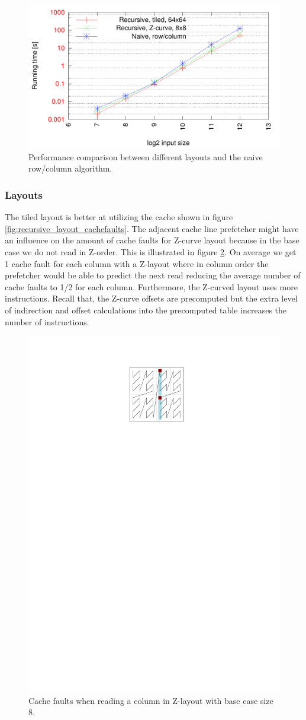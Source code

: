 \begin{figure}[h!]
  \centering
  \includegraphics[width=\textwidth]{"../project2/gnuplots/recursive_performance"}
  \caption{Performance comparison between different layouts and the naive row/column algorithm.}
  \label{fig:recursive_layout_performance}
\end{figure}

\subsubsection{Layouts}

The tiled layout is better at utilizing the cache shown in figure \ref{fig:recursive_layout_cachefaults}. The adjacent cache line prefetcher might have an influence on the amount of cache faults for Z-curve layout because in the base case we do not read in Z-order. This is illustrated in figure \ref{fig:z-order}. On average we get 1 cache fault for each column with a Z-layout where in column order the prefetcher would be able to predict the next read reducing the average number of cache faults to 1/2 for each column. Furthermore, the Z-curved layout uses more instructions. Recall that, the Z-curve offsets are precomputed but the extra level of indirection and offset calculations into the precomputed table increases the number of instructions.

\begin{figure}[h!]
  \centering
  \includegraphics[width=.3\textwidth]{images/zlayout_cachefaults}
  \caption{Cache faults when reading a column in Z-layout with base case size 8.}
  \label{fig:z-order}
\end{figure}

